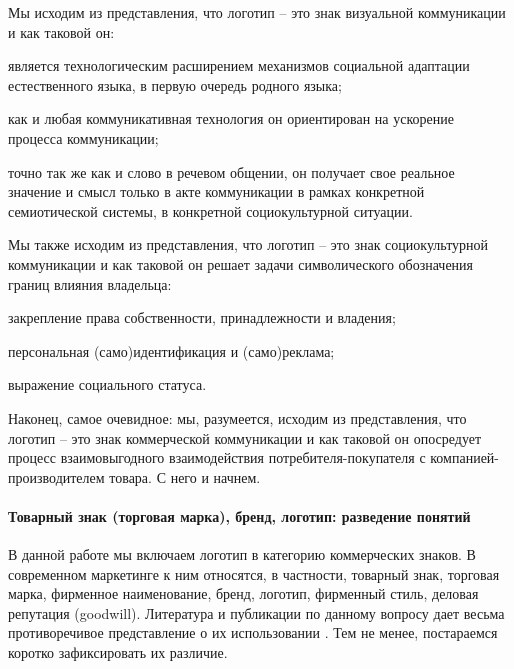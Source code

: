 Мы исходим из представления, что логотип -- это знак визуальной коммуникации и
как таковой он:
\begin{enumerate*}
\item является технологическим расширением механизмов социальной адаптации
  естественного языка, в первую очередь родного языка;
\item как и любая коммуникативная технология он ориентирован на ускорение
  процесса коммуникации;
\item точно так же как и слово в речевом общении, он получает свое реальное
  значение и смысл только в акте коммуникации в рамках конкретной
  семиотической системы, в конкретной социокультурной ситуации.
\end{enumerate*}

Мы также исходим из представления, что логотип -- это знак социокультурной
коммуникации и как таковой он решает задачи символического обозначения границ
влияния владельца:
\begin{enumerate*}[label=\asbuk*)]
\item закрепление права собственности, принадлежности и владения;
\item персональная (само)идентификация и (само)реклама;
\item выражение социального статуса.
\end{enumerate*}

Наконец, самое очевидное: мы, разумеется, исходим из представления, что логотип --
это знак коммерческой коммуникации и как таковой он опосредует процесс взаимовыгодного
взаимодействия потребителя-покупателя с компанией-производителем товара. С него и начнем.

\paragraph{Товарный знак (торговая марка), бренд, логотип: разведение понятий}

В данной работе мы включаем логотип в категорию коммерческих знаков. В современном
маркетинге к ним относятся, в частности, товарный знак, торговая марка,
фирменное наименование, бренд, логотип, фирменный стиль, деловая репутация (goodwill).
Литература и публикации по данному вопросу дает весьма противоречивое
представление о их использовании \autocite{clifton2009}\autocite{eiri2011}\autocite{designing2009}\autocite{mollerup1999marks}\autocite{serov2005}\autocite{werkman1986}. Тем не менее, постараемся коротко зафиксировать их различие.

